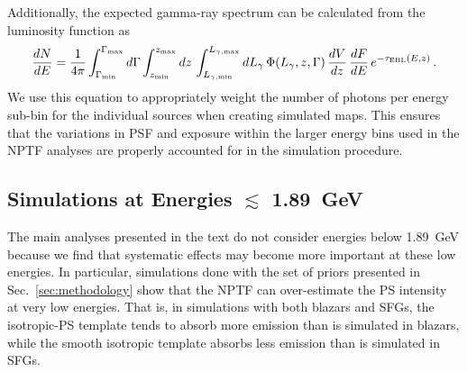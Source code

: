 Additionally, the expected gamma-ray spectrum can be calculated from the luminosity function as
\begin{equation}
\frac{dN}{dE} = \frac{1}{4\pi} \int_{\Gamma_\text{min}}^{\Gamma_\text{max}} d\Gamma \int_{z_\text{min}}^{z_\text{max}} dz \, \int_{L_{\gamma,\text{min}}}^{L_{\gamma,\text{max}}} dL_\gamma \, \Phi(L_\gamma,z,\Gamma) \, \frac{dV}{dz}\,\frac{dF}{dE} \, e^{-\tau_\text{\tiny{EBL}}(E,z)} \, .
\label{eq: dIdE}
\end{equation}
We use this equation to appropriately weight the number of photons per energy sub-bin for the individual sources when creating simulated maps. This ensures that the variations in PSF and exposure within the larger energy bins used in the NPTF analyses are properly accounted for in the simulation procedure.

\subsection{Simulations at Energies $\lesssim$ 1.89~GeV}
\label{app:verylowenergies}

The main analyses presented in the text do not consider energies below 1.89~GeV because we find that systematic effects may become more important at these low energies.  In particular, simulations done with the set of priors presented in Sec.~\ref{sec:methodology} show that the NPTF can over-estimate the PS intensity at very low energies.   
That is, in simulations with both blazars and SFGs, the isotropic-PS template tends to absorb more emission than is simulated in blazars, while the smooth isotropic template absorbs less emission than is simulated in SFGs.
 
